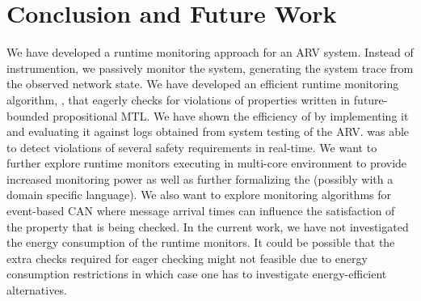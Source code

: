 
\section{Conclusion and Future Work}
We have developed a runtime monitoring approach for an ARV system.
Instead of instrumention, we passively monitor the system, generating the system trace from the observed network state.
We have developed an efficient runtime monitoring algorithm, \monitor, that eagerly checks for violations of properties written in future-bounded propositional MTL. We have shown the efficiency of \monitor by implementing it and evaluating it against logs obtained from system testing of the ARV.
\monitor was able to detect violations of several safety requirements in real-time.
We want to further explore runtime monitors executing in multi-core environment to provide increased monitoring power as well as further formalizing the \sfmap (possibly with a domain specific language).
We also want to explore monitoring algorithms for event-based CAN where message arrival times can influence the satisfaction of the property that is being checked. 
In the current work, we have not investigated the energy consumption of the runtime monitors. It could be possible that the extra checks required for eager checking might not feasible due to energy consumption restrictions in which case one has to investigate energy-efficient alternatives.
